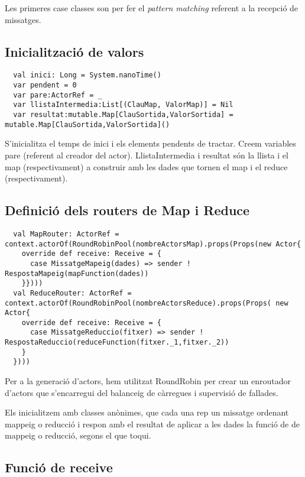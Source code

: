 \documentclass[11pt,a4paper,twoside]{report}
\begin{document}
Les primeres case classes son per fer el \textit{pattern matching} referent a la recepció de missatges.

\subsection{Inicialització de valors}
\begin{lstlisting}
  val inici: Long = System.nanoTime()
  var pendent = 0
  var pare:ActorRef = _
  var llistaIntermedia:List[(ClauMap, ValorMap)] = Nil
  var resultat:mutable.Map[ClauSortida,ValorSortida] = mutable.Map[ClauSortida,ValorSortida]()
\end{lstlisting}

S'inicialitza el temps de inici i els elements pendents de tractar. Creem variables pare (referent al creador del actor).
LlistaIntermedia i resultat són la llista i el map (respectivament) a construir amb les dades que tornen el map i el reduce (respectivament).

\subsection{Definició dels routers de Map i Reduce}

\begin{lstlisting}
  val MapRouter: ActorRef = context.actorOf(RoundRobinPool(nombreActorsMap).props(Props(new Actor{
    override def receive: Receive = {
      case MissatgeMapeig(dades) => sender ! RespostaMapeig(mapFunction(dades))
    }})))
  val ReduceRouter: ActorRef = context.actorOf(RoundRobinPool(nombreActorsReduce).props(Props( new Actor{
    override def receive: Receive = {
      case MissatgeReduccio(fitxer) => sender ! RespostaReduccio(reduceFunction(fitxer._1,fitxer._2))
    }
  })))
\end{lstlisting}

Per a la generació d'actors, hem utilitzat RoundRobin per crear un enroutador d'actors que s'encarregui del balanceig de càrregues i supervisió de fallades.

Els inicialitzem amb classes anònimes, que cada una rep un missatge ordenant mappeig o reducció i respon amb el resultat de aplicar a les dades la funció de de mappeig o reducció, segons el que toqui.

\subsection{Funció de receive}
\end{document}
